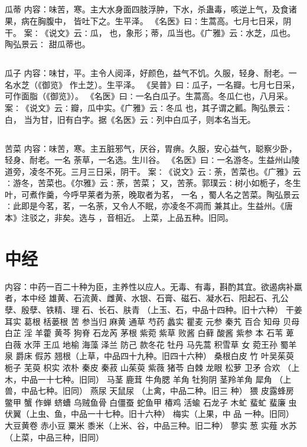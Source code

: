 \documentclass[12pt,UTF8]{ctexbook}
\begin{document}
\chapter{}瓜蒂
内容：味苦，寒。主大水身面四肢浮肿，下水，杀蛊毒，咳逆上气，及食诸果，病在胸腹中， 
皆吐下之。生平泽。 
《名医》曰∶生蒿高。七月七日采，阴干。 
案∶《说文》云∶瓜， 也，象形；蒂，瓜当也。《广雅》云∶水芝，瓜也。陶弘景云∶ 
甜瓜蒂也。 


\chapter{}瓜子
内容：味甘，平。主令人阅泽，好颜色，益气不饥。久服，轻身、耐老。一名水芝（《御览》 
作土芝）。生平泽。 
《吴普》曰∶瓜子，一名瓣。七月七日采，可作面脂（《御览》）。 
《名医》曰∶一名白瓜子。生蒿高。冬瓜仁也，八月采。 
案∶《说文》云∶瓣，瓜中实。《广雅》云∶冬瓜 也，其子谓之瓤。陶弘景云∶白， 
当为甘，旧有白字。据《名医》云∶列中白瓜子，则本名当无。 


\chapter{}苦菜
内容：味苦，寒。主五脏邪气，厌谷，胃痹。久服，安心益气，聪察少卧，轻身、耐老。一名 
荼草，一名选。生川谷。 
《名医》曰∶一名游冬。生益州山陵道旁，凌冬不死。三月三日采，阴干。 
案∶《说文》云∶荼，苦菜也。《广雅》云∶游冬，苦菜也。《尔雅》云∶荼，苦菜； 
又，苦荼。郭璞云∶树小如栀子，冬生叶，可煮作羹，今呼早莱者为荼，晚取者为茗， 
一名 ，蜀人名之苦菜。陶弘景云∶此即是今茗，茗，一名荼，又令人不眠，亦凌冬不凋而 
兼其止。生益州。《唐本》注驳之，非矣。选与 ，音相近。 
上菜，上品五种。旧同。 

\part{中经}

内容：中药一百二十种为臣，主养性以应人。无毒、有毒，斟酌其宜。欲遏病补羸者，本中经 
雄黄、石流黄、雌黄、水银、石膏、磁石、凝水石、阳起石、孔公孽、殷孽、铁精、理 
石、长石、肤青 （上玉、石，中品十四种。旧十六种） 干姜 耳实 葛根 栝蒌根 苦 
参当归 麻黄 通草 芍药 蠡实 瞿麦 元参 秦艽 百合 知母 贝母 白芷 淫 
羊藿 黄芩 狗脊 石龙芮 茅根 紫菀 紫草 败酱 白藓 酸酱 紫参 本 石苇 
萆 白薇 水萍 王瓜 地榆 海藻 泽兰 防己 款冬花 牡丹 马先蒿 积雪草 女 
菀王孙 蜀羊泉 爵床 假苏 翘根（上草，中品四十九种。旧四十六种） 桑根白皮 竹 
叶吴茱萸 栀子 芜萸 枳实 浓朴 秦皮 秦菽 山茱萸 紫薇 猪苓 白棘 龙眼 
松萝 卫矛 合欢 （上木，中品一十七种。旧同） 马茎 鹿茸 牛角腮 羊角 牡狗阴 
茎羚羊角 犀角 （上兽，中品七种。旧同） 燕尿 天鼠尿 （上禽，中品二种。旧三 
种） 猥 
皮露蜂房 鳖甲 蟹 作蝉 蛴螬 乌贼鱼骨 白僵蚕 蛇鱼甲 椿鸡 活蝓 石龙子 
木虻 蜚虻 蜚廉 虫 伏翼（上虫、鱼，中品一十七种。旧十六种） 梅实（上果，中 
品 
一种。旧同） 大豆黄卷 赤小豆 粟米 黍米（上米、谷，中品三种。旧二种） 蓼实 葱 
实薤 水苏（上菜，中品三种，旧同） 
\end{document}
